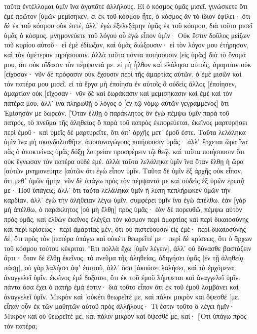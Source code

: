ταῦτα ἐντέλλομαι ὑμῖν ἵνα ἀγαπᾶτε ἀλλήλους. 
Εἰ ὁ κόσμος ὑμᾶς μισεῖ, γινώσκετε ὅτι ἐμὲ πρῶτον [ὑμῶν μεμίσηκεν. 
εἰ ἐκ τοῦ κόσμου ἦτε, ὁ κόσμος ἂν τὸ ἴδιον ἐφίλει· ὅτι δὲ ἐκ τοῦ κόσμου οὐκ ἐστέ, ἀλλ᾽ ἐγὼ ἐξελεξάμην ὑμᾶς ἐκ τοῦ κόσμου, διὰ τοῦτο μισεῖ ὑμᾶς ὁ κόσμος. 
μνημονεύετε τοῦ λόγου οὗ ἐγὼ εἶπον ὑμῖν· Οὐκ ἔστιν δοῦλος μείζων τοῦ κυρίου αὐτοῦ· εἰ ἐμὲ ἐδίωξαν, καὶ ὑμᾶς διώξουσιν· εἰ τὸν λόγον μου ἐτήρησαν, καὶ τὸν ὑμέτερον τηρήσουσιν. 
ἀλλὰ ταῦτα πάντα ποιήσουσιν [εἰς ὑμᾶς] διὰ τὸ ὄνομά μου, ὅτι οὐκ οἴδασιν τὸν πέμψαντά με. 
εἰ μὴ ἦλθον καὶ ἐλάλησα αὐτοῖς, ἁμαρτίαν οὐκ [εἴχοσαν· νῦν δὲ πρόφασιν οὐκ ἔχουσιν περὶ τῆς ἁμαρτίας αὐτῶν. 
ὁ ἐμὲ μισῶν καὶ τὸν πατέρα μου μισεῖ. 
εἰ τὰ ἔργα μὴ ἐποίησα ἐν αὐτοῖς ἃ οὐδεὶς ἄλλος [ἐποίησεν, ἁμαρτίαν οὐκ [εἴχοσαν· νῦν δὲ καὶ ἑωράκασιν καὶ μεμισήκασιν καὶ ἐμὲ καὶ τὸν πατέρα μου. 
ἀλλ᾽ ἵνα πληρωθῇ ὁ λόγος ὁ [ἐν τῷ νόμῳ αὐτῶν γεγραμμένος] ὅτι Ἐμίσησάν με δωρεάν. 
[Ὅταν ἔλθῃ ὁ παράκλητος ὃν ἐγὼ πέμψω ὑμῖν παρὰ τοῦ πατρός, τὸ πνεῦμα τῆς ἀληθείας ὃ παρὰ τοῦ πατρὸς ἐκπορεύεται, ἐκεῖνος μαρτυρήσει περὶ ἐμοῦ· 
καὶ ὑμεῖς δὲ μαρτυρεῖτε, ὅτι ἀπ᾽ ἀρχῆς μετ᾽ ἐμοῦ ἐστε. 
Ταῦτα λελάληκα ὑμῖν ἵνα μὴ σκανδαλισθῆτε. 
ἀποσυναγώγους ποιήσουσιν ὑμᾶς· ἀλλ᾽ ἔρχεται ὥρα ἵνα πᾶς ὁ ἀποκτείνας ὑμᾶς δόξῃ λατρείαν προσφέρειν τῷ θεῷ. 
καὶ ταῦτα ποιήσουσιν ὅτι οὐκ ἔγνωσαν τὸν πατέρα οὐδὲ ἐμέ. 
ἀλλὰ ταῦτα λελάληκα ὑμῖν ἵνα ὅταν ἔλθῃ ἡ ὥρα [αὐτῶν μνημονεύητε [αὐτῶν ὅτι ἐγὼ εἶπον ὑμῖν. Ταῦτα δὲ ὑμῖν ἐξ ἀρχῆς οὐκ εἶπον, ὅτι μεθ᾽ ὑμῶν ἤμην. 
νῦν δὲ ὑπάγω πρὸς τὸν πέμψαντά με καὶ οὐδεὶς ἐξ ὑμῶν ἐρωτᾷ με· Ποῦ ὑπάγεις; 
ἀλλ᾽ ὅτι ταῦτα λελάληκα ὑμῖν ἡ λύπη πεπλήρωκεν ὑμῶν τὴν καρδίαν. 
ἀλλ᾽ ἐγὼ τὴν ἀλήθειαν λέγω ὑμῖν, συμφέρει ὑμῖν ἵνα ἐγὼ ἀπέλθω. ἐὰν [γὰρ μὴ ἀπέλθω, ὁ παράκλητος [οὐ μὴ ἔλθῃ] πρὸς ὑμᾶς· ἐὰν δὲ πορευθῶ, πέμψω αὐτὸν πρὸς ὑμᾶς. 
καὶ ἐλθὼν ἐκεῖνος ἐλέγξει τὸν κόσμον περὶ ἁμαρτίας καὶ περὶ δικαιοσύνης καὶ περὶ κρίσεως· 
περὶ ἁμαρτίας μέν, ὅτι οὐ πιστεύουσιν εἰς ἐμέ· 
περὶ δικαιοσύνης δέ, ὅτι πρὸς τὸν [πατέρα ὑπάγω καὶ οὐκέτι θεωρεῖτέ με· 
περὶ δὲ κρίσεως, ὅτι ὁ ἄρχων τοῦ κόσμου τούτου κέκριται. 
Ἔτι πολλὰ ἔχω [ὑμῖν λέγειν], ἀλλ᾽ οὐ δύνασθε βαστάζειν ἄρτι· 
ὅταν δὲ ἔλθῃ ἐκεῖνος, τὸ πνεῦμα τῆς ἀληθείας, ὁδηγήσει ὑμᾶς [ἐν τῇ ἀληθείᾳ πάσῃ], οὐ γὰρ λαλήσει ἀφ᾽ ἑαυτοῦ, ἀλλ᾽ ὅσα [ἀκούσει λαλήσει, καὶ τὰ ἐρχόμενα ἀναγγελεῖ ὑμῖν. 
ἐκεῖνος ἐμὲ δοξάσει, ὅτι ἐκ τοῦ ἐμοῦ λήμψεται καὶ ἀναγγελεῖ ὑμῖν. 
πάντα ὅσα ἔχει ὁ πατὴρ ἐμά ἐστιν· διὰ τοῦτο εἶπον ὅτι ἐκ τοῦ ἐμοῦ λαμβάνει καὶ ἀναγγελεῖ ὑμῖν. 
Μικρὸν καὶ [οὐκέτι θεωρεῖτέ με, καὶ πάλιν μικρὸν καὶ ὄψεσθέ [με. 
εἶπαν οὖν ἐκ τῶν μαθητῶν αὐτοῦ πρὸς ἀλλήλους· Τί ἐστιν τοῦτο ὃ λέγει ἡμῖν· Μικρὸν καὶ οὐ θεωρεῖτέ με, καὶ πάλιν μικρὸν καὶ ὄψεσθέ με; καί· [Ὅτι ὑπάγω πρὸς τὸν πατέρα; 
